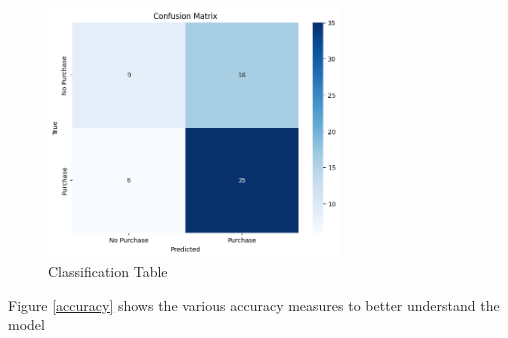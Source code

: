 \documentclass[a4paper,10pt]{article}
\begin{document}
\begin{figure}[ht]
\centering
\includegraphics[height=6.6cm]{figures/confusion_matrix.png}
\caption{Classification Table}
\label{class_tab}
\end{figure}
\vspace{10pt}
Figure \ref{accuracy} shows the various accuracy measures to better understand the model
\end{document}
